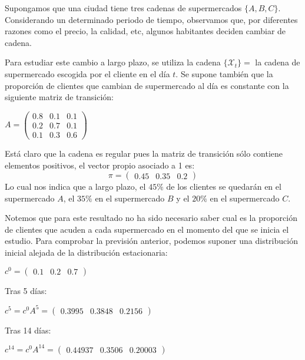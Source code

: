 \begin{exampleth}
Supongamos que una ciudad tiene tres cadenas de supermercados $\{A,B,C\}$. Considerando un determinado periodo de tiempo, observamos que, por diferentes razones como el precio, la calidad, etc, algunos habitantes deciden cambiar de cadena. 

Para estudiar este cambio a largo plazo, se utiliza la cadena $\{\mathcal{X}_t\}=$ la cadena de supermercado escogida por el cliente en el día $t$. Se supone también que la proporción de clientes que cambian de supermercado al día es constante con la siguiente matriz de transición:
\begin{center}
    $A=\begin{pmatrix}
    0.8 & 0.1 & 0.1 \\
    0.2 & 0.7 & 0.1 \\
    0.1 & 0.3 & 0.6 
    \end{pmatrix}$
\end{center}
Está claro que la cadena es regular pues la matriz de transición sólo contiene elementos positivos, el vector propio asociado a 1 es:
\[\pi=\begin{pmatrix}0.45 & 0.35 & 0.2\end{pmatrix}\]
Lo cual nos indica que a largo plazo, el $45\%$ de los clientes se quedarán en el supermercado $A$, el $35\%$ en el supermercado $B$ y el $20\%$ en el supermercado $C$.

Notemos que para este resultado no ha sido necesario saber cual es la proporción de clientes que acuden a cada supermercado en el momento del que se inicia el estudio. Para comprobar la previsión anterior, podemos suponer una distribución inicial alejada de la distribución estacionaria:
\begin{center}
    $c^0=\begin{pmatrix}
    0.1 & 0.2 & 0.7
    \end{pmatrix}$
\end{center}
Tras 5 días:
\begin{center}
    $c^5=c^0A^5=\begin{pmatrix}
    0.3995 & 0.3848 & 0.2156
    \end{pmatrix}$
\end{center}
Tras 14 días:
\begin{center}
    $c^{14}=c^0A^{14}=\begin{pmatrix}
    0.44937 & 0.3506 & 0.20003
    \end{pmatrix}$
\end{center}
\end{exampleth}